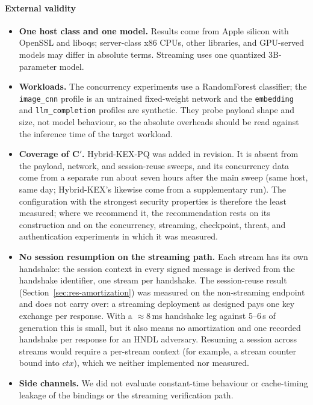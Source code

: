\documentclass[conference]{IEEEtran}
\begin{document}
\paragraph*{External validity}
\begin{itemize}
  \item \textbf{One host class and one model.} Results come from Apple silicon with OpenSSL and liboqs;
  server-class x86 CPUs, other libraries, and GPU-served models may differ in absolute terms. Streaming
  uses one quantized 3B-parameter model.
  \item \textbf{Workloads.} The concurrency experiments use a RandomForest classifier; the
  \texttt{image\_cnn} profile is an untrained fixed-weight network and the \texttt{embedding} and
  \texttt{llm\_completion} profiles are synthetic. They probe payload shape and size, not model
  behaviour, so the absolute overheads should be read against the inference time of the target workload.
  \item \textbf{Coverage of C$'$.} Hybrid-KEX-PQ was added in revision. It is absent from the payload,
  network, and session-reuse sweeps, and its concurrency data come from a separate run about seven hours
  after the main sweep (same host, same day; Hybrid-KEX's likewise come from a supplementary run). The
  configuration with the strongest security properties is therefore the least measured; where we
  recommend it, the recommendation rests on its construction and on the concurrency, streaming,
  checkpoint, threat, and authentication experiments in which it was measured.
  \item \textbf{No session resumption on the streaming path.} Each stream has its own handshake: the
  session context in every signed message is derived from the handshake identifier, one stream per
  handshake. The session-reuse result (Section~\ref{sec:res-amortization}) was measured on the
  non-streaming endpoint and does not carry over: a streaming deployment as designed pays one key
  exchange per response. With a $\approx$8\,ms handshake leg against 5--6\,s of generation this is small, but
  it also means no amortization and one recorded handshake per response for an HNDL adversary. Resuming a
  session across streams would require a per-stream context (for example, a stream counter bound into
  $\mathit{ctx}$), which we neither implemented nor measured.
  \item \textbf{Side channels.} We did not evaluate constant-time behaviour or cache-timing leakage of the
  bindings or the streaming verification path.
\end{itemize}
\end{document}
